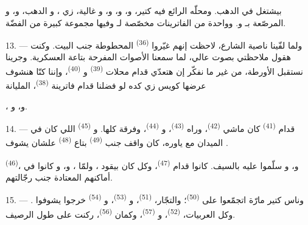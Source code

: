 بيشتغل في الدهب. ومحلّه الرائع فيه  كتير، و،
و، و، و غالية، زي ، و الدهب، و، و المرصّعة
بـ و. وواحدة من الفاترينات مخصّصة
لـ وفيها مجموعة كبيرة من  الفضّة.

13. --- ولما لفّينا ناصية الشارع، لاحظت إنهم غيّروا 
\textsuperscript{(36)} المحطوطة جنب  البيت. وكنت هقول ملاحظتي بصوت عالي،
لما سمعنا الأصوات المفرحة بتاعة  العسكرية. وجرينا نستقبل الأورطة،
من غير ما نفكّر إن  هتعدّي قدام محلات 
\textsuperscript{(39)} و \textsuperscript{(40)}، وإننا كنّا هنشوف
عرضها كويس زي كده لو فضلنا قدام فاترينة  \textsuperscript{(38)}،
المليانة

، و، و.

\VUsaut{3.0mm}

14. --- قدام  \textsuperscript{(41)} كان ماشي 
\textsuperscript{(42)}، وراه  \textsuperscript{(43)}،
و \textsuperscript{(44)}، وفرقة  كلها.
و \textsuperscript{(45)} اللي كان في الميدان مع ياوره، كان واقف جنب
 \textsuperscript{(49)} بتاع  \textsuperscript{(48)}
علشان يشوف .

 \textsuperscript{(46)}، و،
و سلّموا عليه بالسيف.  كانوا قدام
 \textsuperscript{(47)}، وكل  كان بيقود
، ولمّا ، و،
و كانوا في أماكنهم المعتادة جنب رجّالتهم.

15. --- وناس كتير مارّة اتجمّعوا على  \textsuperscript{(50)}؛
والتجّار،  \textsuperscript{(51)}، و
\textsuperscript{(53)}، و \textsuperscript{(54)} خرجوا يشوفوا
. وكل العربيات،  \textsuperscript{(52)}،
و \textsuperscript{(57)}، وكمان 
\textsuperscript{(56)}، ركنت على طول الرصيف.

\VUsaut{3.0mm}


